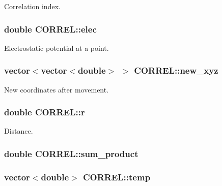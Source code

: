 Correlation index. 

\hypertarget{classCORREL_a5b188c7301ac67c54d9ad7ea4f6f0e1a}{
\subsubsection[{elec}]{\setlength{\rightskip}{0pt plus 5cm}double {\bf CORREL::elec}}}
\label{classCORREL_a5b188c7301ac67c54d9ad7ea4f6f0e1a}


Electrostatic potential at a point. 

\hypertarget{classCORREL_a981a6452d3eec84cb9dd7d6c7dc7d47d}{
\subsubsection[{new\_\-xyz}]{\setlength{\rightskip}{0pt plus 5cm}vector$<$vector$<$double$>$ $>$ {\bf CORREL::new\_\-xyz}}}
\label{classCORREL_a981a6452d3eec84cb9dd7d6c7dc7d47d}


New coordinates after movement. 

\hypertarget{classCORREL_a914a8b0995015e82256961cbb676717c}{
\subsubsection[{r}]{\setlength{\rightskip}{0pt plus 5cm}double {\bf CORREL::r}}}
\label{classCORREL_a914a8b0995015e82256961cbb676717c}


Distance. 

\hypertarget{classCORREL_a5befccd178218ad79376170652d91335}{
\subsubsection[{sum\_\-product}]{\setlength{\rightskip}{0pt plus 5cm}double {\bf CORREL::sum\_\-product}}}
\label{classCORREL_a5befccd178218ad79376170652d91335}
\hypertarget{classCORREL_a898800161dee6f1625130c54948a8f03}{
\subsubsection[{temp}]{\setlength{\rightskip}{0pt plus 5cm}vector$<$double$>$ {\bf CORREL::temp}}}
\label{classCORREL_a898800161dee6f1625130c54948a8f03}


